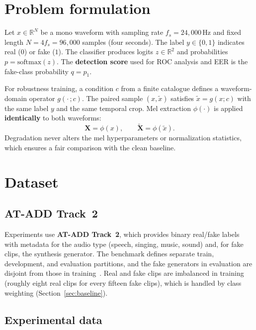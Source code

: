 

\section{Problem formulation}
\label{sec:formulation}

Let $x \in \mathbb{R}^{N}$ be a mono waveform with sampling rate $f_s = 24{,}000$\,Hz and fixed length $N = 4 f_s = 96{,}000$ samples (four seconds). The label $y \in \{0,1\}$ indicates real ($0$) or fake ($1$). The classifier produces logits $z \in \mathbb{R}^2$ and probabilities $p = \mathrm{softmax}(z)$. The \textbf{detection score} used for ROC analysis and EER is the fake-class probability $q = p_1$.

For robustness training, a condition $c$ from a finite catalogue defines a waveform-domain operator $g(\cdot\,; c)$. The paired sample $(x, \tilde{x})$ satisfies $\tilde{x} = g(x; c)$ with the same label $y$ and the same temporal crop. Mel extraction $\phi(\cdot)$ is applied \textbf{identically} to both waveforms:
\begin{equation}
\mathbf{X} = \phi(x), \qquad \tilde{\mathbf{X}} = \phi(\tilde{x}).
\label{eq:pair}
\end{equation}
Degradation never alters the mel hyperparameters or normalization statistics, which ensures a fair comparison with the clean baseline.

\section{Dataset}
\label{sec:data}

\subsection{AT-ADD Track~2}

Experiments use \textbf{AT-ADD Track~2}, which provides binary real/fake labels with metadata for the audio type (speech, singing, music, sound) and, for fake clips, the synthesis generator. The benchmark defines separate train, development, and evaluation partitions, and the fake generators in evaluation are disjoint from those in training~\cite{xie2026atadd}. Real and fake clips are imbalanced in training (roughly eight real clips for every fifteen fake clips), which is handled by class weighting (Section~\ref{sec:baseline}).

\subsection{Experimental data}

